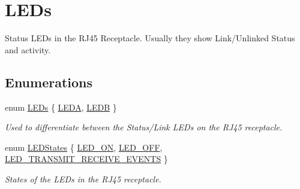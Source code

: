 \hypertarget{group__leds}{}\section{L\+E\+Ds}
\label{group__leds}


Status L\+E\+Ds in the R\+J45 Receptacle. Usually they show Link/\+Unlinked Status and activity.  


\subsection*{Enumerations}
\begin{DoxyCompactItemize}
\item 
enum \mbox{\hyperlink{group__leds_gab6831a7d06c0a2bc69f9b024f6445a80}{L\+E\+Ds}} \{ \mbox{\hyperlink{group__leds_ggab6831a7d06c0a2bc69f9b024f6445a80a511e0f56399fbaa806332616cfbb5c89}{L\+E\+DA}}, 
\mbox{\hyperlink{group__leds_ggab6831a7d06c0a2bc69f9b024f6445a80a6b84a5ce4060faf1567b08a007809c19}{L\+E\+DB}}
 \}
\begin{DoxyCompactList}\small\item\em Used to differentiate between the Status/\+Link L\+E\+Ds on the R\+J45 receptacle. \end{DoxyCompactList}\item 
enum \mbox{\hyperlink{group__leds_gadb7024cd315c36db7da7879b037a2e21}{L\+E\+D\+States}} \{ \mbox{\hyperlink{group__leds_ggadb7024cd315c36db7da7879b037a2e21add01b80eb93658fb4cf7eb9aceb89a1d}{L\+E\+D\+\_\+\+ON}}, 
\mbox{\hyperlink{group__leds_ggadb7024cd315c36db7da7879b037a2e21afc0ca8cc6cbe215fd3f1ae6d40255b40}{L\+E\+D\+\_\+\+O\+FF}}, 
\mbox{\hyperlink{group__leds_ggadb7024cd315c36db7da7879b037a2e21ad40236117a0954a381c6e300bda11ed3}{L\+E\+D\+\_\+\+T\+R\+A\+N\+S\+M\+I\+T\+\_\+\+R\+E\+C\+E\+I\+V\+E\+\_\+\+E\+V\+E\+N\+TS}}
 \}
\begin{DoxyCompactList}\small\item\em States of the L\+E\+Ds in the R\+J45 receptacle. \end{DoxyCompactList}\end{DoxyCompactItemize}
